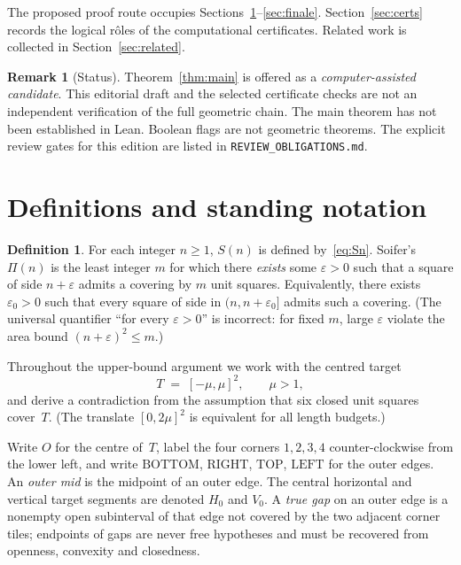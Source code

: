 \documentclass[11pt,reqno]{amsart}
\theoremstyle{definition}
\newtheorem{definition}[theorem]{Definition}
\newtheorem{remark}[theorem]{Remark}
\newcommand{\BOTTOM}{\mathrm{BOTTOM}}
\newcommand{\RIGHT}{\mathrm{RIGHT}}
\newcommand{\TOP}{\mathrm{TOP}}
\newcommand{\LEFT}{\mathrm{LEFT}}
\begin{document}
The proposed proof route occupies Sections~\ref{sec:defs}--\ref{sec:finale}.
Section~\ref{sec:certs} records the logical r\^oles of the computational
certificates.  Related work is collected in Section~\ref{sec:related}.

\begin{remark}[Status]
Theorem~\ref{thm:main} is offered as a \emph{computer-assisted candidate}.
This editorial draft and the selected certificate checks are not an
independent verification of the full geometric chain. The main theorem has
not been established in Lean. Boolean flags are not geometric theorems.
The explicit review gates for this edition are listed in
\texttt{REVIEW\_OBLIGATIONS.md}.
\end{remark}

\section{Definitions and standing notation}\label{sec:defs}

\begin{definition}
For each integer $n\ge 1$, $S(n)$ is defined by~\eqref{eq:Sn}.
Soifer's $\Pi(n)$ is the least integer $m$ for which there \emph{exists} some
$\varepsilon>0$ such that a square of side $n+\varepsilon$ admits a covering by
$m$ unit squares.  Equivalently, there exists $\varepsilon_0>0$ such that every
square of side in $(n,n+\varepsilon_0]$ admits such a covering.
(The universal quantifier ``for every $\varepsilon>0$'' is incorrect: for fixed
$m$, large $\varepsilon$ violate the area bound $(n+\varepsilon)^2\le m$.)
\end{definition}

Throughout the upper-bound argument we work with the centred target
\begin{equation}\label{eq:M1}
T \;=\; [-\mu,\mu]^2,\qquad \mu>1,
\end{equation}
and derive a contradiction from the assumption that six closed unit squares
cover~$T$.  (The translate $[0,2\mu]^2$ is equivalent for all length budgets.)

Write $O$ for the centre of~$T$, label the four corners $1,2,3,4$
counter-clockwise from the lower left, and write $\BOTTOM$, $\RIGHT$, $\TOP$,
$\LEFT$ for the outer edges.  An \emph{outer mid} is the midpoint of an outer
edge.  The central horizontal and vertical target segments are denoted $H_0$ and
$V_0$.  A \emph{true gap} on an outer edge is a nonempty open subinterval of that
edge not covered by the two adjacent corner tiles; endpoints of gaps are never
free hypotheses and must be recovered from openness, convexity and closedness.
\end{document}
